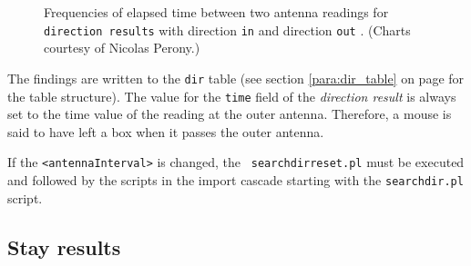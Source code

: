 \begin{figure}[htpb]%
\centering 
{}%
\qquad 
{} 
\caption[Frequencies of elapsed time between antenna readings of direction results]{Frequencies of elapsed time between two antenna readings for \lstinline|direction results| with direction \lstinline|in|  and direction \lstinline|out| . \footnotesize(Charts courtesy of Nicolas Perony.)}
\label{fig:dist_dir_elapse} 

\end{figure}

The findings are written to the \lstinline|dir| table (see section \ref{para:dir_table} on page \pageref{para:dir_table} for the table structure). The value for the \lstinline|time| field of the \textit{direction result} is always set to the time value of the reading at the outer antenna. Therefore, a mouse is said to have left a box when it passes the outer antenna.

If the \lstinline|<antennaInterval>| is changed, the \lstinline| searchdirreset.pl| must be executed and followed by the scripts in the import cascade starting with the \lstinline|searchdir.pl| script.


\subsection{Stay results}
\label{subsec:stayres}

